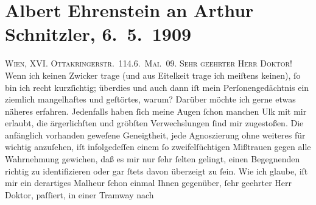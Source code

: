 

         
         \newcommand{\erwaehntePersonen}{Personen: Maurice Donnay}
         \newcommand{\erwaehnteInstitutionen}{Institutionen: Wiener Freie Volksbühne}
         \newcommand{\erwaehnteOrte}{Orte: Königseggasse, Lustspieltheater (Wien), Ottakringerstraße, VI., Mariahilf, Verbandsheim, Wien}
         \newcommand{\erwaehnteWerke}{Werke: Lysistrata}
               \section[Albert Ehrenstein an Arthur Schnitzler, 6. 5. 1909]{ Albert Ehrenstein an Arthur Schnitzler, 6. 5. 1909}\nopagebreak{}\rehead{ }\begin{ledgroupsized}[t]{13cm}\normalsize\beginnumbering \toendnotes[C]{\smallbreak\pagebreak[2]} 
\toendnotes[C]{\smallbreak}\pstart
           {\pb}\textsc{Wien, XVI. Ottakringerstr. 114}.\hfill \textsc{6. Mai. 09}.\pend
           \pstart{}\textsc{Sehr geehrter Herr Doktor!}\pend\pstart
           Wenn ich keinen Zwicker trage (und aus Eitelkeit trage ich meiſtens keinen), ſo
                    bin ich recht kurzſichtig; überdies und auch dann iſt mein Perſonengedächtnis
                    ein ziemlich mangelhaftes und geſtörtes, warum? Darüber möchte ich gerne etwas
                    näheres erfahren. Jedenfalls haben ſich meine Augen ſchon manchen Ulk mit mir
                    erlaubt, die ärgerlichſten und gröbſten Verwechslungen ſind mir zugestoßen. Die
                    anfänglich vorhanden geweſene Geneigtheit, jede Agnoszierung ohne weiteres für
                    wichtig anzuſehen, iſt infolgedeſſen einem ſo zweifelſüchtigen Mißtrauen gegen
                    alle Wahrnehmung gewichen, daß es mir nur ſehr ſelten gelingt, einen Begegnenden
                    richtig zu identifizieren oder gar ſtets davon überzeigt zu ſein. Wie ich
                    glaube, iſt mir ein derartiges Malheur ſchon einmal Ihnen gegenüber, ſehr
                    geehrter \introOben{}Herr\introOben{} Doktor, paſſiert, in einer Tramway nach

\end{ledgroupsized}
